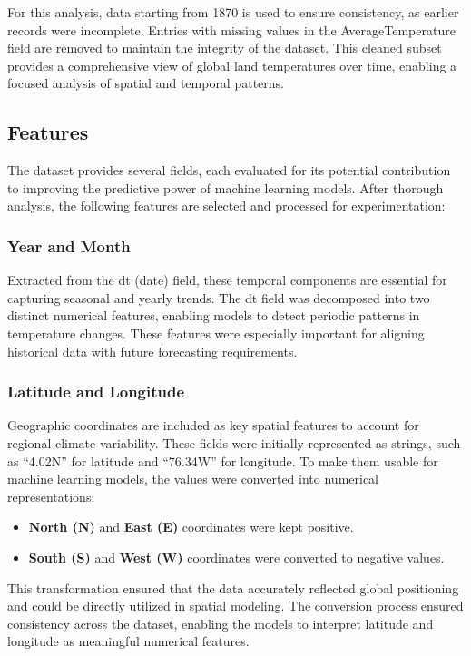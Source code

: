 \documentclass[conference]{IEEEtran}
\begin{document}
For this analysis, data starting from 1870 is used to ensure consistency, as earlier records were incomplete. Entries with missing values in the AverageTemperature field are removed to maintain the integrity of the dataset. This cleaned subset provides a comprehensive view of global land temperatures over time, enabling a focused analysis of spatial and temporal patterns.

\subsection{Features}

The dataset provides several fields, each evaluated for its potential contribution to improving the predictive power of machine learning models. After thorough analysis, the following features are selected and processed for experimentation:

\subsubsection{Year and Month}
Extracted from the dt (date) field, these temporal components are essential for capturing seasonal and yearly trends. The dt field was decomposed into two distinct numerical features, enabling models to detect periodic patterns in temperature changes. These features were especially important for aligning historical data with future forecasting requirements.

\subsubsection{Latitude and Longitude}
Geographic coordinates are included as key spatial features to account for regional climate variability. These fields were initially represented as strings, such as “4.02N” for latitude and “76.34W” for longitude. To make them usable for machine learning models, the values were converted into numerical representations:

\begin{itemize}
\item \textbf{North (N)} and \textbf{East (E)} coordinates were kept positive.
\item \textbf{South (S)} and \textbf{West (W)} coordinates were converted to negative values.
\end{itemize}

This transformation ensured that the data accurately reflected global positioning and could be directly utilized in spatial modeling.
The conversion process ensured consistency across the dataset, enabling the models to interpret latitude and longitude as meaningful numerical features.
\end{document}

